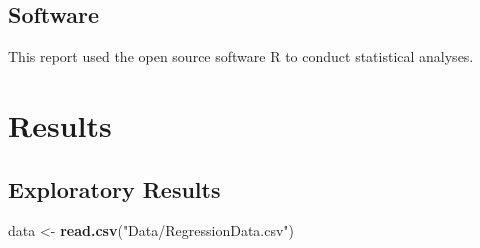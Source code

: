 \documentclass[
]{article}
\newenvironment{Shaded}{\begin{snugshade}}{\end{snugshade}}
\newcommand{\FunctionTok}[1]{\textcolor[rgb]{0.13,0.29,0.53}{\textbf{#1}}}
\newcommand{\NormalTok}[1]{#1}
\newcommand{\OtherTok}[1]{\textcolor[rgb]{0.56,0.35,0.01}{#1}}
\newcommand{\StringTok}[1]{\textcolor[rgb]{0.31,0.60,0.02}{#1}}
\begin{document}
\hypertarget{software}{%
\subsection{Software}\label{software}}

This report used the open source software R to conduct statistical
analyses.

\hypertarget{results}{%
\section{Results}\label{results}}

\hypertarget{exploratory-results}{%
\subsection{Exploratory Results}\label{exploratory-results}}

\begin{Shaded}
\begin{Highlighting}[]
\NormalTok{data }\OtherTok{\textless{}{-}} \FunctionTok{read.csv}\NormalTok{(}\StringTok{"Data/RegressionData.csv"}\NormalTok{)}
\end{Highlighting}
\end{Shaded}
\end{document}
